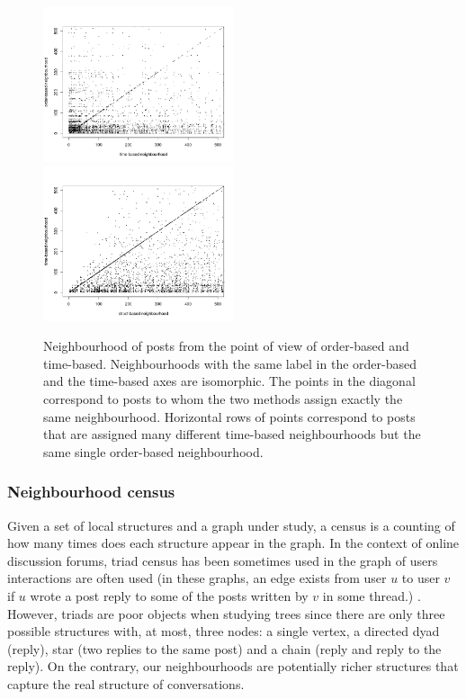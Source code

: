 \documentclass[conference]{IEEEtran}
\begin{document}
\begin{figure}
\centering
\includegraphics[width=0.5\textwidth]{confusion_time_order}%
\includegraphics[width=0.5\textwidth]{confusion_struct_time}
\caption{Neighbourhood of posts from the point of view of order-based and time-based. Neighbourhoods with the same label in the order-based and the time-based axes are isomorphic. The points in the diagonal correspond to posts to whom the two methods assign exactly the same neighbourhood. Horizontal rows of points correspond to posts that are assigned many different time-based neighbourhoods but the same single order-based neighbourhood.}
\label{fig:confusion}
\end{figure}

\subsubsection{Neighbourhood census}
Given a set of local structures and a graph under study, a census is a counting of how many times does each structure appear in the graph. In the context of online discussion forums, triad census has been sometimes used in the graph of users interactions are often used (in these graphs, an edge exists from user $u$ to user $v$ if $u$ wrote a post reply to some of the posts written by $v$ in some thread.) \cite{Adamic2008, Lumbreras2013}. However, triads are poor objects when studying trees since there are only three possible structures with, at most, three nodes: a single vertex, a directed dyad (reply), star (two replies to the same post) and a chain (reply and reply to the reply). On the contrary, our neighbourhoods are potentially richer structures that capture the real structure of conversations.
\end{document}
